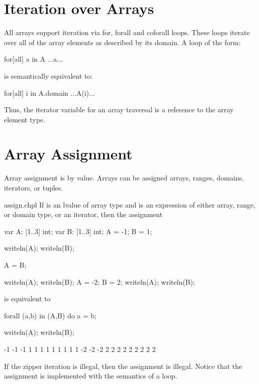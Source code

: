 \section{Iteration over Arrays}
\label{Iteration_over_Arrays}

All arrays support iteration via for, forall and coforall loops.
These loops iterate over all of the array elements as described by its
domain.  A loop of the form:

\begin{chapel}
[co]for[all] a in A
  ...a...
\end{chapel}

is semantically equivalent to:

\begin{chapel}
[co]for[all] i in A.domain
  ...A(i)...
\end{chapel}

Thus, the iterator variable for an array traversal is a reference to
the array element type.


\section{Array Assignment}
\label{Array_Assignment}

Array assignment is by value.  Arrays can be assigned arrays, ranges,
domains, iterators, or tuples.

\begin{chapelexample}{assign.chpl}
If  is an lvalue of array type and  is an expression
of either array, range, or domain type, or an iterator, then the
assignment
\begin{chapelpre}
var A: [1..3] int;
var B: [1..3] int;
A = -1;
B = 1;
\end{chapelpre}
\begin{chapelnoprint}
writeln(A);
writeln(B);
\end{chapelnoprint}
\begin{chapel}
A = B;
\end{chapel}
\begin{chapelnoprint}
writeln(A);
writeln(B);
A = -2;
B = 2;
writeln(A);
writeln(B);
\end{chapelnoprint}
is equivalent to
\begin{chapel}
forall (a,b) in (A,B) do
  a = b;
\end{chapel}
\begin{chapelpost}
writeln(A);
writeln(B);
\end{chapelpost}
\begin{chapeloutput}
-1 -1 -1
1 1 1
1 1 1
1 1 1
-2 -2 -2
2 2 2
2 2 2
2 2 2
\end{chapeloutput}
If the zipper iteration is illegal, then the assignment is illegal.
Notice that the assignment is implemented with the semantics of
a  loop.
\end{chapelexample}

